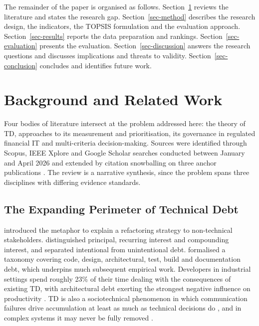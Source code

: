 \documentclass[
  authoryear,
  preprint]{elsarticle}
\begin{document}
The remainder of the paper is organised as follows.
Section~\ref{sec-related} reviews the literature and states the research
gap. Section~\ref{sec-method} describes the research design, the
indicators, the TOPSIS formulation and the evaluation approach.
Section~\ref{sec-results} reports the data preparation and rankings.
Section~\ref{sec-evaluation} presents the evaluation.
Section~\ref{sec-discussion} answers the research questions and
discusses implications and threats to validity.
Section~\ref{sec-conclusion} concludes and identifies future work.

\section{Background and Related Work}\label{sec-related}

Four bodies of literature intersect at the problem addressed here: the
theory of TD, approaches to its measurement and prioritisation, its
governance in regulated financial IT and multi-criteria decision-making.
Sources were identified through Scopus, IEEE Xplore and Google Scholar
searches conducted between January and April 2026 and extended by
citation snowballing on three anchor publications
\citep{kruchtenTechnicalDebtMetaphor2012, lenarduzziSystematicLiteratureReview2021, forsgrenAccelerate2018}.
The review is a narrative synthesis, since the problem spans three
disciplines with differing evidence standards.

\subsection{The Expanding Perimeter of Technical
Debt}\label{the-expanding-perimeter-of-technical-debt}

\citet{cunninghamWyCashPortfolioManagement1992} introduced the metaphor
to explain a refactoring strategy to non-technical stakeholders.
\citet{mcconnellManagingTechnicalDebt2008} distinguished principal,
recurring interest and compounding interest, and separated intentional
from unintentional debt. \citet{kruchtenTechnicalDebtMetaphor2012}
formalised a taxonomy covering code, design, architectural, test, build
and documentation debt, which underpins much subsequent empirical work.
Developers in industrial settings spend roughly 23\% of their time
dealing with the consequences of existing TD, with architectural debt
exerting the strongest negative influence on productivity
\citep{beskerTechnicalDebtEmpirical2020}. TD is also a sociotechnical
phenomenon in which communication failures drive accumulation at least
as much as technical decisions do \citep{ahmadTechnicalDebtNot2026}, and
in complex systems it may never be fully removed
\citep{vidoniInfiniteTechnicalDebt2022}.
\end{document}
